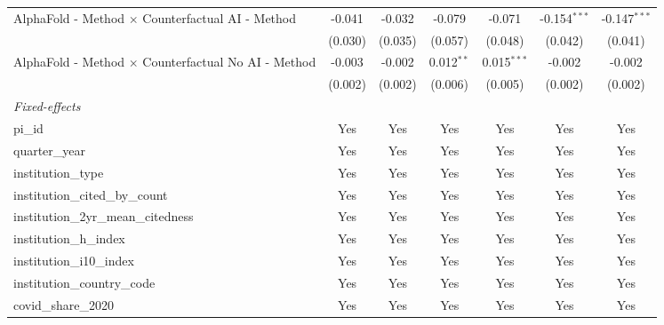 \begin{tabular}{lcccccc}
   AlphaFold - Method $\times$ Counterfactual AI - Method      & -0.041        & -0.032        & -0.079       & -0.071        & -0.154$^{***}$ & -0.147$^{***}$\\   
                                                               & (0.030)       & (0.035)       & (0.057)      & (0.048)       & (0.042)        & (0.041)\\   
   AlphaFold - Method $\times$ Counterfactual No AI - Method   & -0.003        & -0.002        & 0.012$^{**}$ & 0.015$^{***}$ & -0.002         & -0.002\\   
                                                               & (0.002)       & (0.002)       & (0.006)      & (0.005)       & (0.002)        & (0.002)\\   
   \midrule
   \emph{Fixed-effects}\\
   pi\_id                                                      & Yes           & Yes           & Yes          & Yes           & Yes            & Yes\\  
   quarter\_year                                               & Yes           & Yes           & Yes          & Yes           & Yes            & Yes\\  
   institution\_type                                           & Yes           & Yes           & Yes          & Yes           & Yes            & Yes\\  
   institution\_cited\_by\_count                               & Yes           & Yes           & Yes          & Yes           & Yes            & Yes\\  
   institution\_2yr\_mean\_citedness                           & Yes           & Yes           & Yes          & Yes           & Yes            & Yes\\  
   institution\_h\_index                                       & Yes           & Yes           & Yes          & Yes           & Yes            & Yes\\  
   institution\_i10\_index                                     & Yes           & Yes           & Yes          & Yes           & Yes            & Yes\\  
   institution\_country\_code                                  & Yes           & Yes           & Yes          & Yes           & Yes            & Yes\\  
   covid\_share\_2020                                          & Yes           & Yes           & Yes          & Yes           & Yes            & Yes\\  

\end{tabular}
